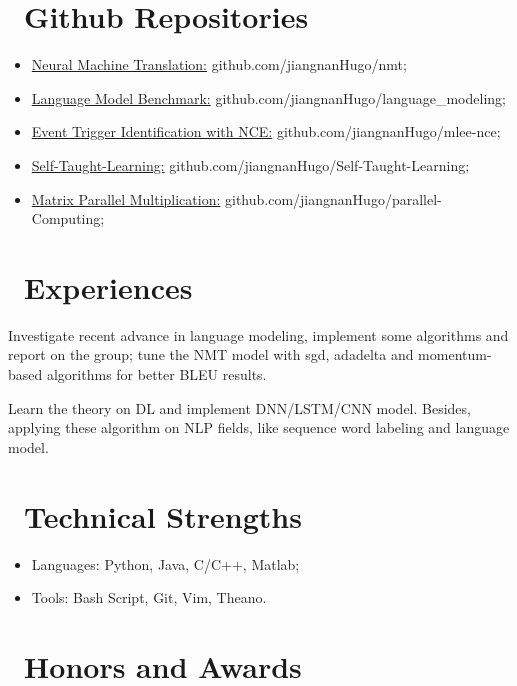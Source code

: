 \documentclass{resume}
\begin{document}
\section{\faGithub\ Github Repositories}
\begin{itemize}[parsep=0.5ex]
  \item \href{https://github.com/jiangnanHugo/nmt}{Neural Machine Translation:} github.com/jiangnanHugo/nmt;
  \item \href{https://github.com/jiangnanHugo/language_modeling}{Language Model Benchmark:} github.com/jiangnanHugo/language\_modeling;
  \item \href{https://github.com/jiangnanHugo/mlee-nce}{Event Trigger Identification with NCE:} github.com/jiangnanHugo/mlee-nce;
  \item \href{https://github.com/jiangnanHugo/Self-Taught-Learning}{Self-Taught-Learning:} github.com/jiangnanHugo/Self-Taught-Learning;
  \item \href{https://github.com/jiangnanHugo/parallel-Computing}{Matrix Parallel Multiplication:} github.com/jiangnanHugo/parallel-Computing;
\end{itemize}

\section{\faUsers\ Experiences }
Investigate recent advance in language modeling, implement some algorithms and report on the group; tune the NMT model with sgd, adadelta and momentum-based algorithms for better BLEU results.

Learn the theory on DL and implement DNN/LSTM/CNN model. Besides, applying these algorithm on NLP fields, like sequence word labeling and language model.

\section{\faCogs\ Technical Strengths}
\begin{itemize}[parsep=0.5ex]
  \item Languages: Python, Java, C/C++, Matlab;
  \item Tools: Bash Script, Git, Vim, Theano.
\end{itemize}

\section{\faStar\ Honors and Awards}
\end{document}

